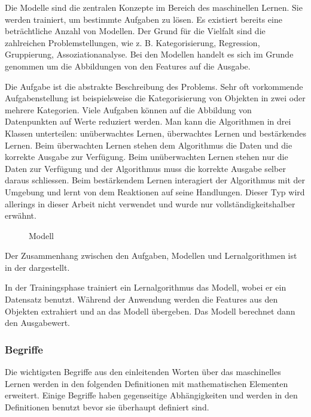 Die Modelle sind die zentralen Konzepte im Bereich des maschinellen Lernen.
Sie werden trainiert, um bestimmte Aufgaben zu lösen.
Es existiert bereits eine beträchtliche Anzahl von Modellen.
Der Grund für die Vielfalt sind die zahlreichen Problemstellungen, wie z. B. Kategorisierung, Regression, Gruppierung, Assoziationanalyse.
Bei den Modellen handelt es sich im Grunde genommen um die Abbildungen von den Features auf die Ausgabe.

Die Aufgabe ist die abstrakte Beschreibung des Problems. 
Sehr oft vorkommende Aufgabenstellung ist beispielsweise die Kategorisierung von Objekten in zwei oder mehrere Kategorien.
Viele Aufgaben können auf die Abbildung von Datenpunkten auf Werte reduziert werden.
Man kann die Algorithmen in drei Klassen unterteilen: unüberwachtes Lernen, überwachtes Lernen und bestärkendes Lernen.
Beim überwachten Lernen stehen dem Algorithmus die Daten und die korrekte Ausgabe zur Verfügung.
Beim unüberwachten Lernen stehen nur die Daten zur Verfügung und der Algorithmus muss die korrekte Ausgabe selber daraus schliessen.
Beim bestärkendem Lernen interagiert der Algorithmus mit der Umgebung und lernt von dem Reaktionen auf seine Handlungen.
Dieser Typ wird allerings in dieser Arbeit nicht verwendet und wurde nur vollständigkeitshalber erwähnt.

\begin{figure}[ht]
	\centering
	
	\caption{Modell}
	\label{fig:bas:overview}
\end{figure}

Der Zusammenhang zwischen den Aufgaben, Modellen und Lernalgorithmen ist in der  dargestellt. 

In der Trainingsphase trainiert ein Lernalgorithmus das Modell, wobei er ein Datensatz benutzt.
Während der Anwendung werden die Features aus den Objekten extrahiert und an das Modell übergeben.
Das Modell berechnet dann den Ausgabewert.

\subsubsection{Begriffe}

Die wichtigsten Begriffe aus den einleitenden Worten über das maschinelles Lernen werden in den folgenden Definitionen mit mathematischen Elementen erweitert.
Einige Begriffe haben gegenseitige Abhängigkeiten und werden in den Definitionen benutzt bevor sie überhaupt definiert sind.


